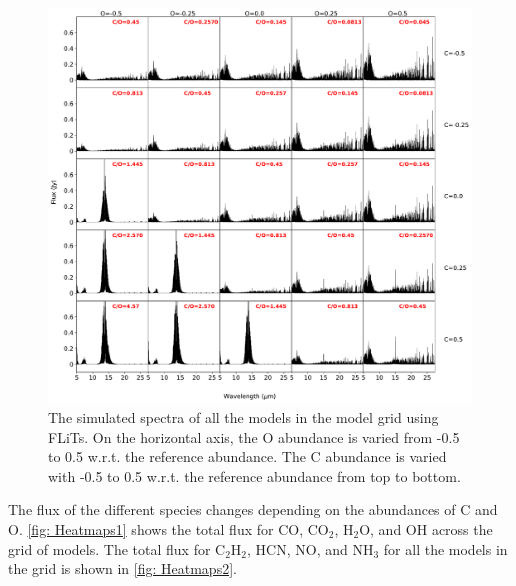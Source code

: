 \documentclass[twoside, single, authoryear, semicolon]{lion-msc}
\newcommand{\4}{$_4$}
\newcommand{\3}{$_3$}
\newcommand{\2}{$_2$}
\begin{document}
\begin{figure}[!ht]
    \centering
    \includegraphics[width=\linewidth]{Figures/All_spectra.pdf}
    \caption{The simulated spectra of all the models in the model grid using FLiTs. On the horizontal axis, the O abundance is varied from -0.5 to 0.5 w.r.t. the reference abundance. The C abundance is varied with -0.5 to 0.5 w.r.t. the reference abundance from top to bottom.}
    \label{fig: all spectra}
\end{figure}

The flux of the different species changes depending on the abundances of C and O. \autoref{fig: Heatmaps1} shows the total flux for CO, CO\2, H\2O, and OH across the grid of models. The total flux for C\2H\2, HCN, NO, and NH\3 for all the models in the grid is shown in \autoref{fig: Heatmaps2}. 


\end{document}
